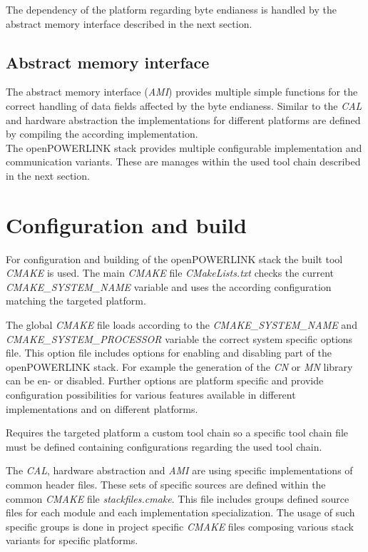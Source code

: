 The dependency of the platform regarding byte endianess is handled by the abstract memory interface described in the next section.

\subsection{Abstract memory interface}
\label{sec:oplk_architecture_ami}

The abstract memory interface (\emph{AMI}) provides multiple simple functions for the correct handling of data fields affected by the byte endianess.
Similar to the \emph{CAL} and hardware abstraction the implementations for different platforms are defined by compiling the according implementation. \cite[AMI]{openpowerlink_doc}
\\

The openPOWERLINK stack provides multiple configurable implementation and communication variants.
These are manages within the used tool chain described in the next section.

\section{Configuration and build}
\label{sec:oplk_build}
For configuration and building of the openPOWERLINK stack the built tool \emph{CMAKE} is used.
The main \emph{CMAKE} file \emph{CMakeLists.txt} checks the current \emph{CMAKE\_SYSTEM\_NAME} variable and uses the according configuration matching the targeted platform.

The global \emph{CMAKE} file loads according to the \emph{CMAKE\_SYSTEM\_NAME} and \emph{CMAKE\_SYSTEM\_PROCESSOR} variable the correct system specific options file.
This option file includes options for enabling and disabling part of the openPOWERLINK stack.
For example the generation of the \emph{CN} or \emph{MN} library can be en- or disabled.
Further options are platform specific and provide configuration possibilities for various features available in different implementations and on different platforms.

Requires the targeted platform a custom tool chain so a specific tool chain file must be defined containing configurations regarding the used tool chain.

The \emph{CAL}, hardware abstraction and \emph{AMI} are using specific implementations of common header files.
These sets of specific sources are defined within the common \emph{CMAKE} file \emph{stackfiles.cmake}.
This file includes groups defined source files for each module and each implementation specialization.
The usage of such specific groups is done in project specific \emph{CMAKE} files composing various stack variants for specific platforms. \cite[Building openPOWERLINK]{openpowerlink_doc}

